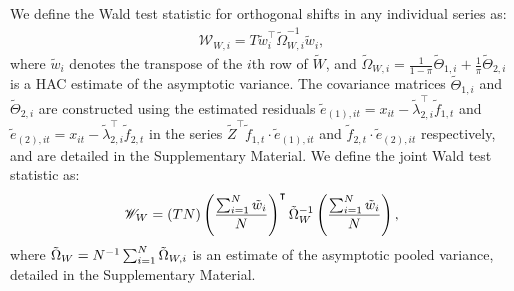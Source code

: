 \documentclass[12pt]{article}
\newcommand*{\tran}{\intercal}
\theoremstyle{plain}
\numberwithin{equation}{section}
\begin{document}
We define the Wald test statistic for orthogonal shifts in any individual series as:
\begin{align}
\label{eqn:w_ind_test}
\mathscr{W}_{W, i} = T \tilde{w}_i^\tran \tilde{\Omega}_{W, i}^{-1} \tilde{w}_i,
\end{align}
where $\tilde{w}_i$ denotes the transpose of the $i$th row of $\tilde{W}$, and $\tilde{\Omega}_{W, i} = \frac{1}{1 - \pi}\tilde{\Theta}_{1, i} + \frac{1}{\pi} \tilde{\Theta}_{2, i}$ is a HAC estimate of the asymptotic variance. The covariance matrices $\tilde{\Theta}_{1, i}$ and $\tilde{\Theta}_{2, i}$ are constructed using the estimated residuals $\tilde{e}_{(1), it} = x_{it} - \tilde{\lambda}_{2, i}^\tran \tilde{f}_{1, t}$ and $\tilde{e}_{(2), it} = x_{it} - \tilde{\lambda}_{2, i}^\tran \tilde{f}_{2, t}$ in the series $\tilde{Z}^\tran \tilde{f}_{1, t} \cdot \tilde{e}_{(1), it}$ and $\tilde{f}_{2, t} \cdot \tilde{e}_{(2), it}$ respectively, and are detailed in the Supplementary Material. We define the joint Wald test statistic as:
\begin{align}
\label{eqn:W_pool_test}
\mathscr{W}_{W} = (TN) \left( \frac{\sumN \tilde{w}_i}{N}\right)^\tran \tilde{\Omega}_{W}^{-1} \left( \frac{\sumN \tilde{w}_i}{N}\right),
\end{align}
where $\tilde{\Omega}_{W} = N^{-1} \sum_{i = 1}^{N} \tilde{\Omega}_{W, i}$ is an estimate of the asymptotic pooled variance, detailed in the Supplementary Material.
\end{document}
